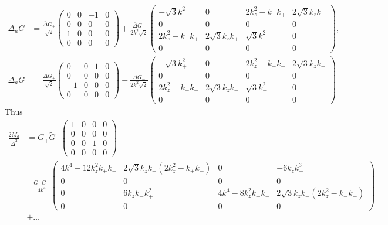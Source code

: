 \documentclass[english, parskip=full]{scrartcl}
\begin{document}
\begin{align}
\Delta_a \tilde{G} &= \frac{\bar{\Delta}\tilde{G}_+ }{\sqrt{2}} \begin{pmatrix}
0 & 0 & -1 & 0 \\ 0 & 0 & 0 & 0 \\ 1 & 0 & 0 & 0 \\ 0 & 0 & 0 & 0
\end{pmatrix} + \frac{\bar{\Delta}\tilde{G}_-}{2k^2\sqrt{2}} \begin{pmatrix}
-\sqrt{3}k_-^2 & 0 & 2k_z^2 - k_-k_+ & 2\sqrt{3}k_zk_+ \\
0&0&0&0 \\
2k_z^2 -k_-k_+ & 2\sqrt{3}k_zk_+ & \sqrt{3}k_+^2 & 0 \\
0&0&0&0
\end{pmatrix},\\
\Delta_a^\dagger G &= \frac{\bar{\Delta}G_+ }{\sqrt{2}} \begin{pmatrix}
0 & 0 & 1 & 0 \\ 0 & 0 & 0 & 0 \\ -1 & 0 & 0 & 0 \\ 0 & 0 & 0 & 0
\end{pmatrix} - \frac{\bar{\Delta}G_-}{2k^2\sqrt{2}} \begin{pmatrix}
-\sqrt{3}k_+^2 & 0 & 2k_z^2 - k_+k_- & 2\sqrt{3}k_zk_- \\
0&0&0&0 \\
2k_z^2 -k_+k_- & 2\sqrt{3}k_zk_- & \sqrt{3}k_-^2 & 0 \\
0&0&0&0
\end{pmatrix}
\end{align}
Thus
\begin{align*}
\frac{2M_a}{\bar{\Delta}^2} &= G_+\tilde{G}_+\begin{pmatrix}
1 & 0 & 0 & 0 \\ 0 & 0 & 0 & 0 \\ 0 & 0 & 1 & 0 \\ 0 & 0 & 0 & 0
\end{pmatrix} - \\
&- \frac{G_-\tilde{G}_-}{4k^4} \begin{pmatrix}
4k^4 - 12k_z^2k_+k_- & 2\sqrt{3}k_zk_- (2k_z^2-k_+k_-) & 0 & -6k_zk_-^3 \\
0&0&0&0\\
0 & 6k_zk_-k_+^2 & 4k^4 - 8k_z^2k_+k_- & 2\sqrt{3}k_zk_- (2k_z^2 - k_-k_+) \\
0&0&0&0
\end{pmatrix} + \\
&+ \dots
\end{align*}
\end{document}
